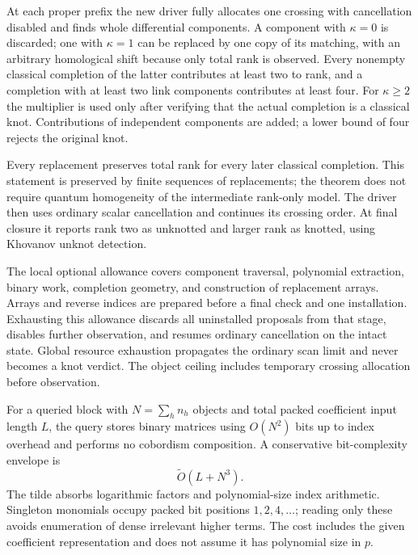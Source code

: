 At each proper prefix the new driver fully allocates one crossing with
cancellation disabled and finds whole differential components.
A component with $\kappa=0$ is discarded; one with $\kappa=1$ can be
replaced by one copy of its matching, with an arbitrary homological shift
because only total rank is observed. Every nonempty classical completion
of the latter contributes at least two to rank, and a completion with
at least two link components contributes at least four.
For $\kappa\ge2$ the multiplier is used only after verifying that the
actual completion is a classical knot.
Contributions of independent components are added; a lower bound of
four rejects the original knot.

Every replacement preserves total rank for every later classical
completion. This statement is preserved by finite sequences of
replacements; the theorem does not require quantum homogeneity of the
intermediate rank-only model. The driver then uses ordinary scalar
cancellation and continues its crossing order. At final closure it
reports rank two as unknotted and larger rank as knotted, using
Khovanov unknot detection.

The local optional allowance covers component traversal, polynomial
extraction, binary work, completion geometry, and construction of
replacement arrays. Arrays and reverse indices are prepared before a
final check and one installation. Exhausting this allowance discards
all uninstalled proposals from that stage, disables further observation,
and resumes ordinary cancellation on the intact state. Global
resource exhaustion propagates the ordinary scan limit and never
becomes a knot verdict. The object ceiling includes temporary crossing
allocation before observation.

For a queried block with $N=\sum_h n_h$ objects and total packed
coefficient input length $L$, the query stores binary matrices using
$O(N^2)$ bits up to index overhead and performs no cobordism composition.
A conservative bit-complexity envelope is
\[
 \widetilde O(L+N^3).
\]
The tilde absorbs logarithmic factors and polynomial-size index
arithmetic. Singleton monomials occupy packed bit positions
$1,2,4,\ldots$; reading only these avoids enumeration of dense
irrelevant higher terms. The cost includes the given coefficient
representation and does not assume it has polynomial size in $p$.

